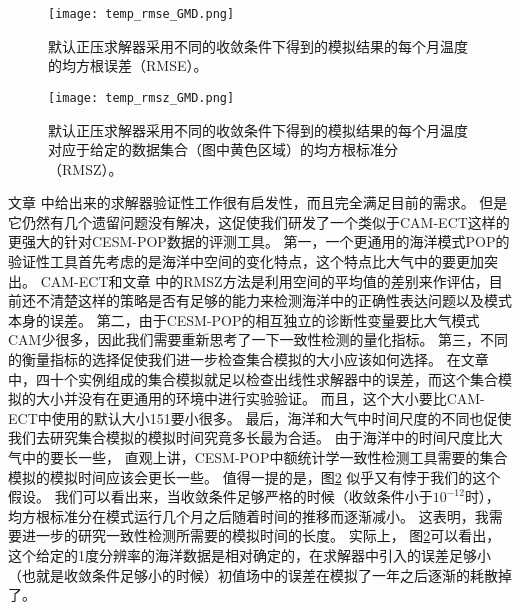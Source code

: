 \begin{figure}
\centering
\texttt{[image: temp\_rmse\_GMD.png]}
\caption {
默认正压求解器采用不同的收敛条件下得到的模拟结果的每个月温度的均方根误差（RMSE）。}
\label{fig:rmse_temp}
\end{figure} 


\begin{figure} 
\begin{center}
\texttt{[image: temp\_rmsz\_GMD.png]}
\end{center}
\caption{默认正压求解器采用不同的收敛条件下得到的模拟结果的每个月温度对应于给定的数据集合（图中黄色区域）的均方根标准分（RMSZ）。}
\label{fig:rmsz_temp_ens}
\end{figure} 


 
文章 \cite{yong2015} 中给出来的求解器验证性工作很有启发性，而且完全满足目前的需求。 
但是它仍然有几个遗留问题没有解决，这促使我们研发了一个类似于CAM-ECT这样的更强大的针对CESM-POP数据的评测工具。 
第一，一个更通用的海洋模式POP的验证性工具首先考虑的是海洋中空间的变化特点，这个特点比大气中的要更加突出。
CAM-ECT和文章\cite{yong2015} 中的RMSZ方法是利用空间的平均值的差别来作评估，目前还不清楚这样的策略是否有足够的能力来检测海洋中的正确性表达问题以及模式本身的误差。
第二，由于CESM-POP的相互独立的诊断性变量要比大气模式CAM少很多，因此我们需要重新思考了一下一致性检测的量化指标。
第三，不同的衡量指标的选择促使我们进一步检查集合模拟的大小应该如何选择。
在文章\cite{yong2015} 中，四十个实例组成的集合模拟就足以检查出线性求解器中的误差，而这个集合模拟的大小并没有在更通用的环境中进行实验验证。
而且，这个大小要比CAM-ECT中使用的默认大小151要小很多。
最后，海洋和大气中时间尺度的不同也促使我们去研究集合模拟的模拟时间究竟多长最为合适。 
由于海洋中的时间尺度比大气中的要长一些， 直观上讲，CESM-POP中额统计学一致性检测工具需要的集合模拟的模拟时间应该会更长一些。 
值得一提的是，图\ref{fig:rmsz_temp_ens} 似乎又有悖于我们的这个假设。 
我们可以看出来，当收敛条件足够严格的时候（收敛条件小于$10^{-12}$时）， 均方根标准分在模式运行几个月之后随着时间的推移而逐渐减小。
这表明，我需要进一步的研究一致性检测所需要的模拟时间的长度。 
实际上， 图\ref{fig:rmsz_temp_ens}可以看出，这个给定的1度分辨率的海洋数据是相对确定的，在求解器中引入的误差足够小（也就是收敛条件足够小的时候）初值场中的误差在模拟了一年之后逐渐的耗散掉了。





